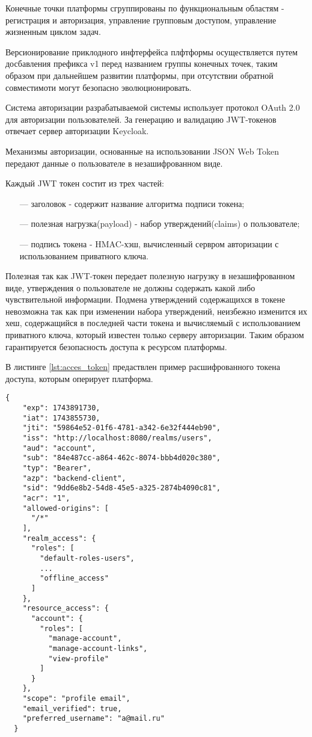Конечные точки платформы сгруппированы по функциональным областям - регистрация и авторизация, управление групповым доступом, управление жизненным циклом задач.

Версионирование приклодного инфтерфейса плфтформы осуществляется путем досбавления префикса v1 перед названием группы конечных точек, таким образом при дальнейшем развитии платформы, при отсутствии обратной совместимоти могут безопасно эволюционировать.

Система авторизации разрабатываемой системы использует протокол OAuth 2.0\cite{boyd2012getting} для авторизации пользователей.
За генерацию и валидацию JWT-токенов\cite{ahmed2019authentication} отвечает сервер авторизации Keycloak.

Механизмы авторизации, основанные на использовании JSON Web Token передают данные о пользователе в незашифрованном виде.

Каждый JWT токен состит из трех частей:

\begin{itemize}
  \item[---]заголовок - содержит название алгоритма подписи токена;
  \item[---]полезная нагрузка(payload) - набор утверждений(claims) о пользователе;
  \item[---]подпись токена - HMAC-хэш, вычисленный сервром авторизации с использованием приватного ключа.
\end{itemize}

Полезная так как JWT-токен передает полезную нагрузку в незашифрованном виде, утверждения о пользователе не должны содержать какой либо чувствительной информации.
Подмена утверждений содержащихся в токене невозможна так как при изменении набора утверждений, неизбежно изменится их хеш, содержащийся в последней части токена и вычисляемый с использованием приватного ключа, который известен только серверу авторизации. Таким образом гарантируется безопасность доступа к ресурсом платформы.

В листинге \ref{lst:acces_token} предаствлен пример расшифрованного токена доступа, которым оперирует платформа.

\begin{lstlisting}[caption={Токен доступа}, label=lst:acces_token]
  {
    "exp": 1743891730,
    "iat": 1743855730,
    "jti": "59864e52-01f6-4781-a342-6e32f444eb90",
    "iss": "http://localhost:8080/realms/users",
    "aud": "account",
    "sub": "84e487cc-a864-462c-8074-bbb4d020c380",
    "typ": "Bearer",
    "azp": "backend-client",
    "sid": "9dd6e8b2-54d8-45e5-a325-2874b4090c81",
    "acr": "1",
    "allowed-origins": [
      "/*"
    ],
    "realm_access": {
      "roles": [
        "default-roles-users",
        ...
        "offline_access"
      ]
    },
    "resource_access": {
      "account": {
        "roles": [
          "manage-account",
          "manage-account-links",
          "view-profile"
        ]
      }
    },
    "scope": "profile email",
    "email_verified": true,
    "preferred_username": "a@mail.ru"
  }
\end{lstlisting}

